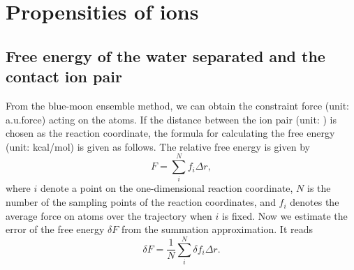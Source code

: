 \chapter{Propensities of ions}\label{propensities_of_ions} 
\section{Free energy of the water separated and the contact ion pair}\label{calculate_free_energy} 
From the blue-moon ensemble method\cite{Carter1989,Sprik1998}, we can obtain the constraint force (unit: a.u.force) acting on the atoms. 
If the distance between the ion pair (unit: \A) is chosen as the reaction coordinate, the formula for calculating the free energy (unit: kcal/mol) is given as follows.
The relative free energy is given by
\begin{equation}
  F = \sum_{i}^{N}f_i{\Delta{r}},\nonumber
  \label{eq:f-e}
\end{equation}
where $i$ denote a point on the one-dimensional reaction coordinate, 
$N$ is the number of the sampling points of the reaction coordinates,
and $f_i$ denotes the average force on atoms over the trajectory when $i$ is fixed. 
Now we estimate the error of the free energy $\delta{F}$ from the summation approximation. It reads
\begin{equation}
  \delta{F} = \frac{1}{N}\sum_{i}^{N}\delta{f_i}{\Delta{r}}.
  \label{eq:dleta_f}
\end{equation}
